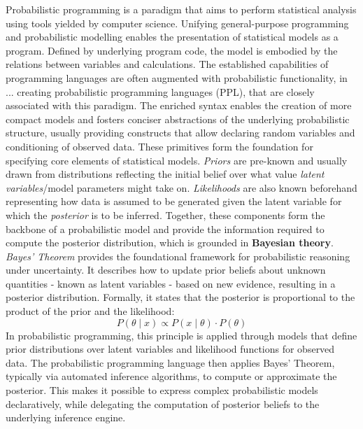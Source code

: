 Probabilistic programming is a paradigm that aims to perform statistical analysis using tools yielded by computer science.\cite{introductionprobabilisticprogramming}
Unifying general-purpose programming and probabilistic modelling enables the presentation of statistical models as a program. Defined by underlying program code, the model is
embodied by the relations between variables and calculations. The established capabilities of programming languages are often augmented with
probabilistic functionality, in ... creating probabilistic programming languages (PPL),\cite{probProgrammingPrinciples,2025modelcheckingprobabilisticoperator}
that are closely associated with this paradigm.
The enriched syntax enables the creation of more compact models and fosters conciser abstractions of the underlying probabilistic structure, usually providing constructs
that allow declaring random variables and conditioning of observed data. These primitives form the foundation for specifying core elements
of statistical models. \textit{Priors} are pre-known and usually drawn from distributions reflecting the initial belief over what value
\textit{latent variables}/model parameters might take on. \textit{Likelihoods} are also known beforehand representing how data is assumed to be generated given the
latent variable for which the \textit{posterior} is to be inferred. Together, these components form the backbone of a probabilistic model and provide the information required
to compute the posterior distribution, which is grounded in \textbf{Bayesian theory}.\cite{introductionprobabilisticprogramming}
\\

\textit{Bayes’ Theorem} provides the foundational framework for probabilistic reasoning under uncertainty. It describes how to update prior beliefs about unknown
quantities - known as latent variables - based on new evidence, resulting in a posterior distribution. Formally, it states that the posterior is proportional to the
product of the prior and the likelihood:
\[
  P(\theta \mid x) \propto P(x \mid \theta) \cdot P(\theta)
\]
In probabilistic programming, this principle is applied through models that define prior distributions over latent variables and likelihood functions for
observed data. The probabilistic programming language then applies Bayes' Theorem, typically via automated inference algorithms, to compute or approximate the posterior.
This makes it possible to express complex probabilistic models declaratively, while delegating the computation of posterior beliefs to the underlying inference engine.
\\

